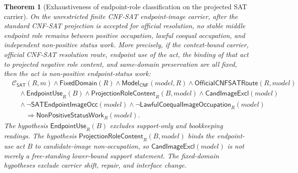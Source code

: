 \documentclass[11pt]{article}
\newtheorem{theorem}{Theorem}[section]
\theoremstyle{definition}
\theoremstyle{remark}
\newcommand{\ClayCtx}{\mathcal{C}_{\mathsf{SAT}}(R,m)}
\newcommand{\EndpointUse}{\mathsf{EndpointUse}}
\newcommand{\FixedDom}{\mathsf{FixedDomain}}
\newcommand{\ModelOfCnf}{\mathsf{Model}_{\mathsf{CNF}}}
\newcommand{\CandImageExcl}{\mathsf{CandImageExcl}}
\newcommand{\SATEndpointImageOcc}{\mathsf{SATEndpointImageOcc}}
\newcommand{\LawfulCoequalImageOcc}{\mathsf{LawfulCoequalImageOccupation}}
\newcommand{\NonPositiveStatusWork}{\mathsf{NonPositiveStatusWork}}
\newcommand{\OfficialCNFSATRoute}{\mathsf{OfficialCNFSATRoute}}
\newcommand{\ProjectionRoleContent}{\mathsf{ProjectionRoleContent}}
\begin{document}
\begin{theorem}[Exhaustiveness of endpoint-role classification on the projected SAT carrier]
\label{thm:projected-sat-role-exhaustiveness}
On the unrestricted finite CNF-SAT endpoint-image carrier, after the standard CNF-SAT projection is accepted for official resolution, no stable middle endpoint role remains between positive occupation, lawful coequal occupation, and independent non-positive status work. More precisely, if the context-bound carrier, official CNF-SAT resolution route, endpoint use of the act, the binding of that act to projected negative role content, and same-domain preservation are all fixed, then the act is non-positive endpoint-status work:
\[
\begin{aligned}
&\ClayCtx\wedge\FixedDom(R)\wedge\ModelOfCnf(model,R)
  \wedge\OfficialCNFSATRoute(R,model)\\
&\quad\wedge\EndpointUse_R(B)
  \wedge\ProjectionRoleContent_R(B,model)
  \wedge\CandImageExcl(model)\\
&\quad\wedge\neg\SATEndpointImageOcc(model)
  \wedge\neg\LawfulCoequalImageOcc_R(model)\\
&\qquad\Rightarrow \NonPositiveStatusWork_R(model).
\end{aligned}
\]
The hypothesis \(\EndpointUse_R(B)\) excludes support-only and bookkeeping readings. The hypothesis \(\ProjectionRoleContent_R(B,model)\) binds the endpoint-use act \(B\) to candidate-image non-occupation, so \(\CandImageExcl(model)\) is not merely a free-standing lower-bound support statement. The fixed-domain hypotheses exclude carrier shift, repair, and interface change.
\end{theorem}
\end{document}
